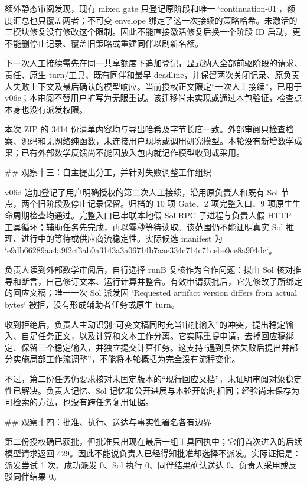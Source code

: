 额外静态审阅发现，现有 mixed gate 只登记原阶段和唯一 `continuation-01`，额度汇总也只覆盖两者；不可变 envelope 绑定了这一次接续的策略哈希。未激活的三模块修复没有修改这个限制。因此不能直接激活修复后换一个阶段 ID 启动，更不能删停止记录、覆盖旧策略或重建同伴以刷新名额。

下一次人工接续需先在同一共享额度下追加登记，显式纳入全部前驱阶段的请求、责任、原生 turn/工具、既有同伴和最早 deadline，并保留两次关闭记录、原负责人失败上下文及最后确认的模型响应。当前授权正文限定“一次人工接续”，已用于 v06c；本审阅不替用户扩写为无限重试。该迁移尚未实现或通过本包验证，检查点本身也没有派发权限。

本次 ZIP 的 3414 份清单内容均与导出哈希及字节长度一致。外部审阅只检查档案、源码和无网络纯函数，未连接用户现场或调用研究模型。本轮没有新增数学成果；已有外部数学反馈尚不能因放入包内就记作模型收到或采用。

## 观察十三：自主提出分工，并针对失败调整工作组织

v06d 追加登记了用户明确授权的第二次人工接续，沿用原负责人和既有 Sol 节点，两个旧阶段及停止记录保留。归档的 10 项 Gate、2 项完整入口、9 项原生生命周期检查均通过。完整入口已串联本地假 Sol RPC 子进程与负责人假 HTTP 工具循环；辅助任务先完成，再以零秒等待读取。该范围仍不能证明真实 Sol 推理、进行中的等待或供应商流稳定性。实际候选 manifest 为 `e9db66289aa4a9f2cf3ab0a3143a3a06714b7aae334c714c71cebe9ce8a904dc`。

负责人读到外部数学审阅后，自行选择 runB 复核作为合作问题：拟由 Sol 核对推导和断言，自己修订文本、运行计算并整合。有效申请获批后，它先修改了所绑定的回应文稿；唯一一次 Sol 派发因 `Requested artifact version differs from actual bytes` 被拒，没有形成辅助者任务或原生 turn。

收到拒绝后，负责人主动识别“可变文稿同时充当审批输入”的冲突，提出稳定输入、自足任务正文，以及计算和文本工作分离。它实际重提申请，去掉回应稿绑定、保留三个稳定输入，并独立提交计算任务。这支持“遇到具体失败后提出并部分实施局部工作流调整”，不能将本轮概括为完全没有流程变化。

不过，第二份任务仍要求核对未固定版本的“现行回应文档”，未证明审阅对象稳定性已解决。负责人记忆、Sol 记忆和公开进展与本轮开始时相同；经验尚未保存为可检索的方法，也没有跨任务复用证据。

## 观察十四：批准、执行、送达与事实性署名各有边界

第二份授权确已获批，但批准只出现在最后一组工具回执中；它们首次进入的后续模型请求返回 429。因此不能说负责人已经得知批准却选择不派发。实际证据是：派发尝试 1 次、成功派发 0、Sol 执行 0、同伴结果确认送达 0、负责人采用或反驳同伴结果 0。

